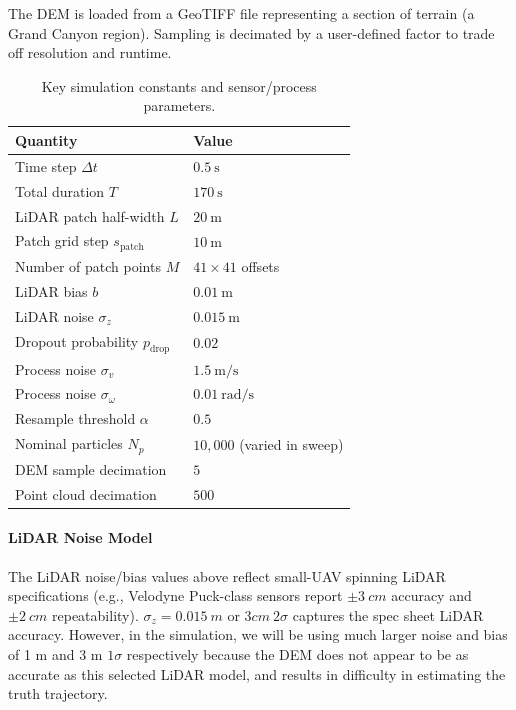 \documentclass[conference]{IEEEtran}
\begin{document}
The DEM is loaded from a GeoTIFF file representing a section of terrain (a Grand Canyon region). Sampling is decimated by a user-defined factor to trade off resolution and runtime.

\begin{table}[t]
  \centering
  \caption{Key simulation constants and sensor/process parameters.}
  \label{tab:constants}
  \begin{tabular}{ll}
    \hline
    Quantity & Value \\
    \hline
    Time step $\Delta t$ & $0.5~\text{s}$ \\
    Total duration $T$ & $170~\text{s}$ \\
    LiDAR patch half-width $L$ & $20~\text{m}$ \\
    Patch grid step $s_{\text{patch}}$ & $10~\text{m}$ \\
    Number of patch points $M$ & $41 \times 41$ offsets \\
    LiDAR bias $b$ & $0.01~\text{m}$ \\
    LiDAR noise $\sigma_z$ & $0.015~\text{m}$ \\
    Dropout probability $p_{\text{drop}}$ & $0.02$ \\
    Process noise $\sigma_v$ & $1.5~\text{m/s}$ \\
    Process noise $\sigma_\omega$ & $0.01~\text{rad/s}$ \\
    Resample threshold $\alpha$ & $0.5$ \\
    Nominal particles $N_p$ & $10{,}000$ (varied in sweep) \\
    DEM sample decimation & $5$  \\
    Point cloud decimation & $500$  \\
    \hline
  \end{tabular}
\end{table}

\paragraph{LiDAR Noise Model} The LiDAR noise/bias values above reflect small-UAV spinning LiDAR specifications (e.g., Velodyne Puck-class sensors report $\pm\SI{3}{cm}$ accuracy and $\pm\SI{2}{cm}$ repeatability). $\sigma_z=\SI{0.015}{m}$ or $3 cm\ 2\sigma$ captures the spec sheet LiDAR accuracy.\cite{velodyne_puck_datasheet} However, in the simulation, we will be using much larger noise and bias of 1 m and 3 m $1\sigma$ respectively because the DEM does not appear to be as accurate as this selected LiDAR model, and results in difficulty in estimating the truth trajectory.
\end{document}
